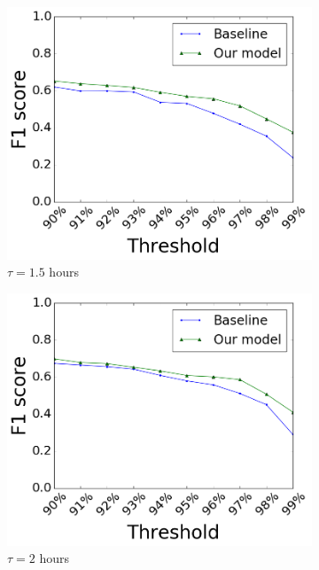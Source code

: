 \begin{figure}[t]
\begin{subfigure}{.32\textwidth}
\centering
\includegraphics[width=.99\linewidth]{img/chap3/gdelt_90_mins.png}
\caption{$\tau=1.5$ hours}\label{fig:gdelt3}
\end{subfigure} %
\hfill
\begin{subfigure}{.32\textwidth}
\centering
\includegraphics[width=.99\linewidth]{img/chap3/gdelt_120_mins.png}
\caption{$\tau=2$ hours}\label{fig:gdelt4}
\end{subfigure}
\begin{subfigure}{.32\textwidth}

\end{subfigure}
\end{figure}

